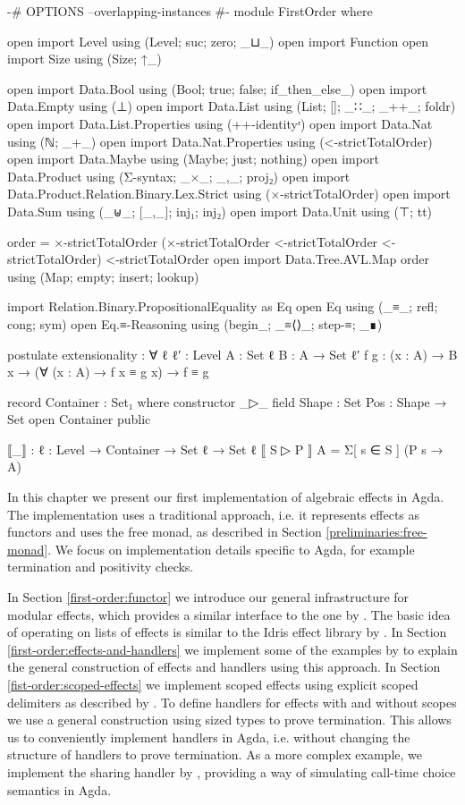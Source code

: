 \begin{code}[hide]
{-# OPTIONS --overlapping-instances #-}
module FirstOrder where

open import Level using (Level; suc; zero; _⊔_)
open import Function
open import Size using (Size; ↑_)

open import Data.Bool using (Bool; true; false; if_then_else_)
open import Data.Empty using (⊥)
open import Data.List using (List; []; _∷_; _++_; foldr)
open import Data.List.Properties using (++-identityʳ)
open import Data.Nat using (ℕ; _+_)
open import Data.Nat.Properties using (<-strictTotalOrder)
open import Data.Maybe using (Maybe; just; nothing)
open import Data.Product using (Σ-syntax; _×_; _,_; proj₂)
open import Data.Product.Relation.Binary.Lex.Strict using (×-strictTotalOrder)
open import Data.Sum using (_⊎_; [_,_]; inj₁; inj₂)
open import Data.Unit using (⊤; tt)

order = ×-strictTotalOrder (×-strictTotalOrder <-strictTotalOrder <-strictTotalOrder) <-strictTotalOrder
open import Data.Tree.AVL.Map order using (Map; empty; insert; lookup)

import Relation.Binary.PropositionalEquality as Eq
open Eq using (_≡_; refl; cong; sym)
open Eq.≡-Reasoning using (begin_; _≡⟨⟩_; step-≡; _∎)

postulate
  extensionality : ∀ {ℓ ℓ′ : Level} {A : Set ℓ} {B : A → Set ℓ′} {f g : (x : A) → B x}
      → (∀ (x : A) → f x ≡ g x) → f ≡ g

record Container : Set₁ where
  constructor _▷_
  field
    Shape : Set
    Pos : Shape → Set
open Container public

⟦_⟧ : {ℓ : Level} → Container → Set ℓ → Set ℓ
⟦ S ▷ P ⟧ A = Σ[ s ∈ S ] (P s → A)
\end{code}

In this chapter we present our first implementation of algebraic effects in Agda.
The implementation uses a traditional approach, i.e. it represents effects as
functors and uses the free monad, as described in Section
\ref{preliminaries:free-monad}.
We focus on implementation details specific to Agda, for example termination and
positivity checks.

In Section \ref{first-order:functor} we introduce our general infrastructure for
modular effects, which provides a similar interface to the one by
\textcite{DBLP:conf/haskell/WuSH14}.
The basic idea of operating on lists of effects is similar to the Idris effect
library by \textcite{DBLP:conf/icfp/Brady13}.
In Section \ref{first-order:effects-and-handlers} we implement some of the
examples by \textcite{DBLP:conf/haskell/WuSH14} to explain the general
construction of effects and handlers using this approach.
In Section \ref{fist-order:scoped-effects} we implement scoped effects using
explicit scoped delimiters as described by \textcite{DBLP:conf/haskell/WuSH14}.
To define handlers for effects with and without scopes we use a general
construction using sized types to prove termination.
This allows us to conveniently implement handlers in Agda, i.e. without changing
the structure of handlers to prove termination.
As a more complex example, we implement the sharing handler by
\textcite{bunkenburg2019modeling}, providing a way of simulating call-time
choice semantics in Agda.


